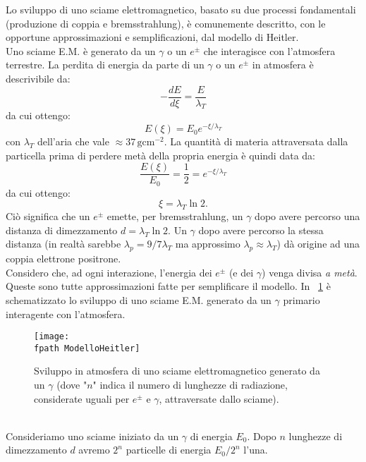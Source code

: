 \documentclass[10pt,a4paper,usenatbib]{article}
\newcommand*{\unit}[1]{\ensuremath{\mathrm{\,#1}}}                              %
\newcommand{\fpath}{./Figs/}
\begin{document}
Lo sviluppo di uno sciame elettromagnetico, basato su due processi fondamentali (produzione di coppia e bremsstrahlung), è comunemente descritto, con le opportune approssimazioni e semplificazioni, dal modello di Heitler. 
\\Uno sciame E.M. è generato da un $\gamma$ o un $e^\pm$ che interagisce con l'atmosfera terrestre. La perdita di energia da parte di un $\gamma$ o un $e^\pm$ in atmosfera è descrivibile da: 
\begin{equation}
-\frac{dE}{d\xi} = \frac{E}{\lambda_T}
\end{equation}
da cui ottengo: 
\begin{equation}
E(\xi) = E_0 e^{- \xi/\lambda_T}
\end{equation}
con $\lambda_T$ dell'aria che vale $\approx 37\unit{g cm^{-2}}$. La quantità di materia attraversata dalla particella prima di perdere metà della propria energia è quindi data da: 
\begin{equation}
\frac{E(\xi)}{E_0} = \frac{1}{2} =  e^{- \xi/\lambda_T}
\end{equation}
da cui ottengo: 
\begin{equation}
\xi = \lambda_T \ln{2}. 
\end{equation}
Ciò significa che un $e^\pm$ emette, per bremsstrahlung, un $\gamma$ dopo avere percorso una distanza di dimezzamento $d = \lambda_T \ln{2}$. Un $\gamma$ dopo avere percorso la stessa distanza (in realtà sarebbe $\lambda_p = 9/7 \lambda_T$ ma approssimo $\lambda_p \approx \lambda_T$) dà origine ad una coppia elettrone positrone. 
\\Considero che, ad ogni interazione, l'energia dei $e^\pm$ (e dei $\gamma$) venga divisa \textit{a metà}. Queste sono tutte approssimazioni fatte per semplificare il modello. In \figurename~\ref{\fpath jpg:ModelloHeitler} è schematizzato lo sviluppo di uno sciame E.M. generato da un $\gamma$ primario interagente con l'atmosfera. 
\begin{figure} [h!]
\centering
\texttt{[image: \\fpath ModelloHeitler]}
\caption{Sviluppo in atmosfera di uno sciame elettromagnetico generato da un $\gamma$ (dove "$n$" indica il numero di lunghezze di radiazione, considerate uguali per $e^\pm$ e $\gamma$, attraversate dallo sciame). }
\label{\fpath jpg:ModelloHeitler}
\end{figure}
\\Consideriamo uno sciame iniziato da un $\gamma$ di energia $E_0$. Dopo $n$ lunghezze di dimezzamento $d$ avremo $2^n$ particelle di energia $E_0/2^n$ l'una. 
\end{document}
